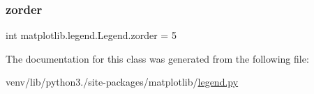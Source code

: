 \mbox{\label{classmatplotlib_1_1legend_1_1Legend_ac0d738fd956dde1a861307094b44aac9}} 
\subsubsection{\texorpdfstring{zorder}{zorder}}
{\footnotesize\ttfamily int matplotlib.\+legend.\+Legend.\+zorder = 5\hspace{0.3cm}{\ttfamily [static]}}



The documentation for this class was generated from the following file\+:\begin{DoxyCompactItemize}
\item 
venv/lib/python3./site-\/packages/matplotlib/\hyperlink{legend_8py}{legend.\+py}\end{DoxyCompactItemize}
